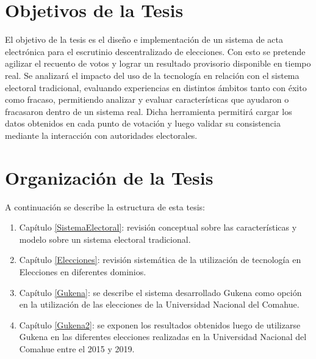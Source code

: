 \section{Objetivos de la Tesis}
El objetivo de la tesis es el diseño e implementación de un sistema de acta electrónica para el escrutinio descentralizado de elecciones. Con esto se pretende agilizar el recuento de votos y lograr un resultado provisorio disponible en tiempo real. Se analizará el impacto del uso de la tecnología en relación con el sistema electoral tradicional, evaluando experiencias en distintos ámbitos tanto con éxito como fracaso, permitiendo analizar y evaluar características que ayudaron o fracasaron dentro de un sistema real.\newline
Dicha herramienta permitirá cargar los datos obtenidos en cada punto de votación y luego validar su consistencia mediante la interacción con autoridades electorales. 

\section{Organización de la Tesis}
A continuación se describe la estructura de esta tesis:
\begin{enumerate}
    \item Capítulo \ref{SistemaElectoral}: revisión conceptual sobre las características y modelo sobre un sistema electoral tradicional.
    \item Capítulo \ref{Elecciones}: revisión sistemática de la utilización de tecnología en  Elecciones en diferentes dominios.
    \item Capítulo \ref{Gukena}: se describe el sistema desarrollado Gukena como opción en la utilización de las elecciones de la Universidad Nacional del Comahue.
    \item Capítulo \ref{Gukena2}: se exponen los resultados obtenidos luego de utilizarse Gukena en las diferentes elecciones realizadas en la Universidad Nacional del Comahue entre el 2015 y 2019.
\end{enumerate}



